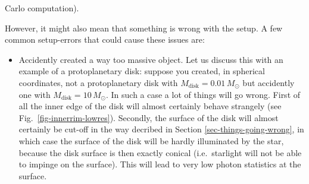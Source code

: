 \documentclass{report}
\begin{document}
\begin{enumerate}
\begin{enumerate}
      Carlo computation).
  \end{enumerate}
  However, it might also mean that something is wrong with the setup. A few
  common setup-errors that could cause these issues are:
  \begin{itemize}
  \item Accidently created a way too massive object. Let us discuss this
    with an example of a protoplanetary disk: suppose you created, in
    spherical coordinates, not a protoplanetary disk with
    $M_{\mathrm{disk}}=0.01\,M_{\odot}$ but accidently one with
    $M_{\mathrm{disk}}=10\,M_{\odot}$. In such a case a lot of things will
    go wrong. First of all the inner edge of the disk will almost certainly
    behave strangely (see Fig.~\ref{fig-innerrim-lowres}). Secondly, the
    surface of the disk will almost certainly be cut-off in the way decribed
    in Section \ref{sec-things-going-wrong}, in which case the surface of
    the disk will be hardly illuminated by the star, because the disk
    surface is then exactly conical (i.e.\ starlight will not be able to
    impinge on the surface). This will lead to very low photon statistics
    at the surface. 
  \end{itemize}
\end{enumerate}



% 




\end{document}
